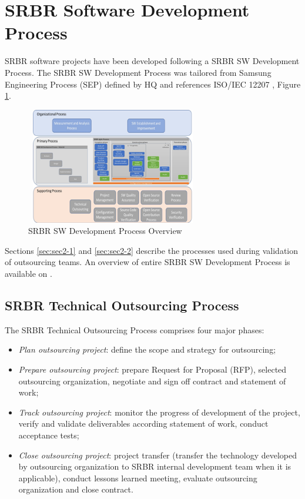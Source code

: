 \section{SRBR Software Development Process \label{sec:sec2}}

SRBR software projects have been developed following a SRBR SW Development Process. The SRBR SW Development Process was tailored from Samsung Engineering Process (SEP) defined by HQ and references ISO/IEC 12207 \cite{IEEE12207-08}, Figure \ref{fig:devprocess}.

\begin{figure}[!h]
\includegraphics[height=2in, width=3in]{DevProcess}
\caption{SRBR SW Development Process Overview}
\label{fig:devprocess}
\end{figure}

Sections \ref{sec:sec2-1} and \ref{sec:sec2-2} describe the processes used during validation of outsourcing teams. An overview of entire SRBR SW Development Process is available on \cite{Costa18}.

\subsection{SRBR Technical Outsourcing Process \label{sec:sec2-1}}

The SRBR Technical Outsourcing Process comprises four major phases:

\begin{itemize}
\item \textit{Plan outsourcing project}: define the scope and strategy for outsourcing;
\item \textit{Prepare outsourcing project}: prepare Request for Proposal (RFP), selected outsourcing organization, negotiate and sign off contract and statement of work;
\item \textit{Track outsourcing project}: monitor the progress of development of the project, verify and validate deliverables according statement of work, conduct acceptance tests;
\item \textit{Close outsourcing project}: project transfer (transfer the technology developed by outsourcing organization to SRBR internal development team when it is applicable), conduct lessons learned meeting, evaluate outsourcing organization and close contract.
\end{itemize}

